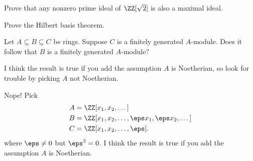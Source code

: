 \begin{sproblem}
	Prove that any nonzero prime ideal of $\ZZ[\sqrt 2]$ is also a maximal ideal.
	\label{prob:dedekind_sample}
\end{sproblem}

\begin{problem}
	\gim
	Prove the Hilbert basis theorem.
\end{problem}

\begin{problem}[BC] %
	\gim
	Let $A \subseteq B \subseteq C$ be rings.
	Suppose $C$ is a finitely generated $A$-module.
	Does it follow that $B$ is a finitely generated $A$-module?
	\begin{hint}
		I think the result is true if you add the assumption $A$ is Noetherian,
		so look for trouble by picking $A$ not Noetherian.
	\end{hint}
	\begin{sol}
		Nope! Pick
		\begin{align*}
			A &= \ZZ[x_1, x_2, \dots] \\
			B &= \ZZ[x_1, x_2, \dots, \eps x_1, \eps x_2, \dots] \\
			C &= \ZZ[x_1, x_2, \dots, \eps].
		\end{align*}
		where $\eps \neq 0$ but $\eps^2 = 0$.
		I think the result is true if you add the assumption $A$ is Noetherian.
	\end{sol}
\end{problem}


